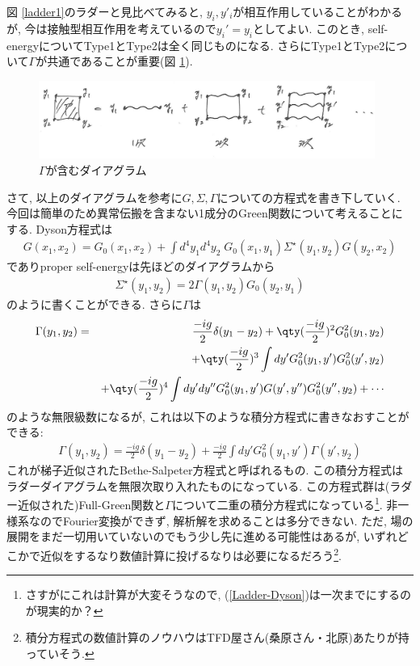 \documentclass[10.5pt,a4paper]{jreport}
\begin{document}
図 \ref{ladder1}のラダーと見比べてみると, $y_i, y'_i$が相互作用していることがわかるが, 今は接触型相互作用を考えているので$y_i' = y_i$としてよい. このとき, self-energyについてType1とType2は全く同じものになる.  さらにType1とType2について$\Gamma$が共通であることが重要(図 \ref{ladder3}).
\begin{figure}[htbp]
  \begin{center}
    \includegraphics[width = 11cm]{./EPS/ladder3.eps}
  \end{center}
  \caption{$\Gamma$が含むダイアグラム}\label{ladder3}
\end{figure}
さて, 以上のダイアグラムを参考に$G, \Sigma, \Gamma$についての方程式を書き下していく. 今回は簡単のため異常伝搬を含まない1成分のGreen関数について考えることにする. Dyson方程式は
\begin{eqnarray}
  G(x_1, x_2) = G_0(x_1, x_2) + \int d^4y_1d^4y_2\;G_0(x_1, y_1)\Sigma^\star(y_1, y_2)G(y_2, x_2)\label{Ladder-Dyson}
\end{eqnarray}
でありproper self-energyは先ほどのダイアグラムから
\begin{eqnarray}
  \Sigma^\star(y_1, y_2) = 2\Gamma(y_1, y_2)G_0(y_2, y_1)
\end{eqnarray}
のように書くことができる. さらに$\Gamma$は
\begin{eqnarray}
\nonumber  \Gamma(y_1, y_2) &=& \frac{-ig}{2}\delta(y_1 - y_2) + \qty(\frac{-ig}{2})^2G_0^2(y_1, y_2)\\
\nonumber  &&+ \qty(\frac{-ig}{2})^3\int dy' G_0^2(y_1, y')G_0^2(y', y_2)\\
  &&+ \qty(\frac{-ig}{2})^4\int dy'dy'' G_0^2(y_1, y')G(y', y'')G_0^2(y'', y_2) + \cdots
\end{eqnarray}
のような無限級数になるが, これは以下のような積分方程式に書きなおすことができる:
\begin{eqnarray}
  \Gamma(y_1, y_2) = \frac{-ig}{2}\delta(y_1 - y_2) + \frac{-ig}{2}\int dy'G_0^2(y_1, y')\Gamma(y', y_2)\label{Bethe-Salpeter}
\end{eqnarray}
これが梯子近似されたBethe-Salpeter方程式と呼ばれるもの. この積分方程式はラダーダイアグラムを無限次取り入れたものになっている. この方程式群は(ラダー近似された)Full-Green関数と$\Gamma$について二重の積分方程式になっている\footnote{さすがにこれは計算が大変そうなので, (\ref{Ladder-Dyson})は一次までにするのが現実的か？}. 非一様系なのでFourier変換ができず, 解析解を求めることは多分できない. ただ, 場の展開をまだ一切用いていないのでもう少し先に進める可能性はあるが, いずれどこかで近似をするなり数値計算に投げるなりは必要になるだろう\footnote{積分方程式の数値計算のノウハウはTFD屋さん(桑原さん・北原)あたりが持っていそう. }. 
\end{document}
